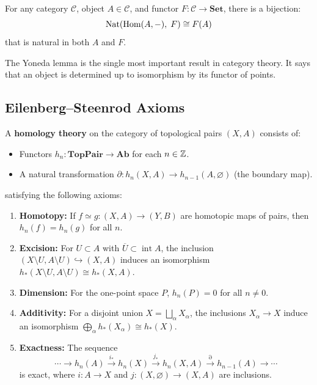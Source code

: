\begin{theorem}
For any category $\mathcal{C}$, object $A \in \mathcal{C}$, and functor $F: \mathcal{C} \to \textbf{Set}$, there is a bijection:
\[
\operatorname{Nat}(\operatorname{Hom}(A,-),\; F) \cong F(A)
\]
that is natural in both $A$ and $F$.
\end{theorem}

The Yoneda lemma is the single most important result in category theory. It says that an object is determined up to isomorphism by its functor of points.

\subsection{Eilenberg--Steenrod Axioms}

\begin{definition}
A \textbf{homology theory} on the category of topological pairs $(X,A)$ consists of:
\begin{itemize}
    \item Functors $h_n: \textbf{TopPair} \to \textbf{Ab}$ for each $n \in \mathbb{Z}$.
    \item A natural transformation $\partial: h_n(X,A) \to h_{n-1}(A,\varnothing)$ (the boundary map).
\end{itemize}
satisfying the following axioms:
\end{definition}

\begin{enumerate}
    \item \textbf{Homotopy:} If $f \simeq g: (X,A) \to (Y,B)$ are homotopic maps of pairs, then $h_n(f) = h_n(g)$ for all $n$.
    \item \textbf{Excision:} For $U \subset A$ with $\overline{U} \subset \operatorname{int} A$, the inclusion $(X\setminus U, A\setminus U) \hookrightarrow (X,A)$ induces an isomorphism $h_*(X\setminus U, A\setminus U) \cong h_*(X,A)$.
    \item \textbf{Dimension:} For the one-point space $P$, $h_n(P) = 0$ for all $n \neq 0$.
    \item \textbf{Additivity:} For a disjoint union $X = \bigsqcup_\alpha X_\alpha$, the inclusions $X_\alpha \to X$ induce an isomorphism $\bigoplus_\alpha h_*(X_\alpha) \cong h_*(X)$.
    \item \textbf{Exactness:} The sequence
    \[
    \cdots \to h_n(A) \xrightarrow{i_*} h_n(X) \xrightarrow{j_*} h_n(X,A) \xrightarrow{\partial} h_{n-1}(A) \to \cdots
    \]
    is exact, where $i: A \to X$ and $j: (X,\varnothing) \to (X,A)$ are inclusions.
\end{enumerate}

